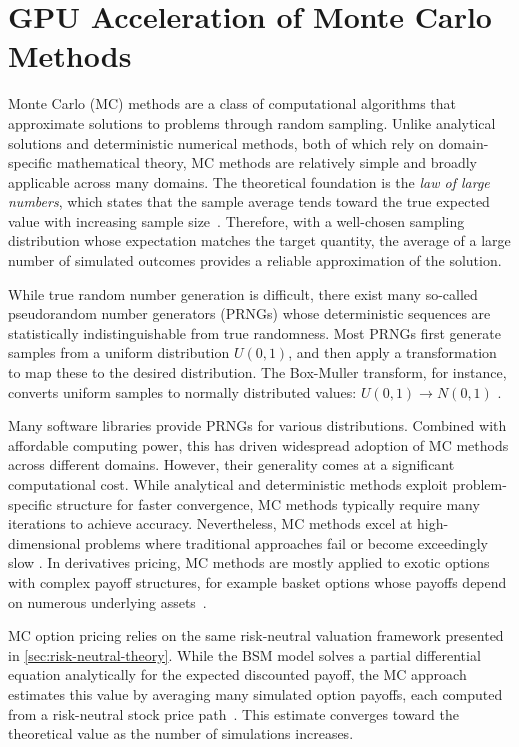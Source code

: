\documentclass[english,12pt,a4paper,pdftex,sci,utf8]{aaltothesis}
\begin{document}
\section{GPU Acceleration of Monte Carlo Methods} \label{sec:gpu-mc}
Monte Carlo (MC) methods are a class of computational algorithms that approximate solutions to problems through random sampling. Unlike analytical solutions and deterministic numerical methods, both of which rely on domain-specific mathematical theory, MC methods are relatively simple and broadly applicable across many domains. The theoretical foundation is the \emph{law of large numbers}, which states that the sample average tends toward the true expected value with increasing sample size~\cite{Ross2020prob}. Therefore, with a well-chosen sampling distribution whose expectation matches the target quantity, the average of a large number of simulated outcomes provides a reliable approximation of the solution.

While true random number generation is difficult, there exist many so-called pseudorandom number generators (PRNGs) whose deterministic sequences are statistically indistinguishable from true randomness. Most PRNGs first generate samples from a uniform distribution $U(0,1)$, and then apply a transformation to map these to the desired distribution. The Box-Muller transform, for instance, converts uniform samples to normally distributed values: $U(0,1) \rightarrow N(0,1)$ \cite{gentle2003random}.

Many software libraries provide PRNGs for various distributions. Combined with affordable computing power, this has driven widespread adoption of MC methods across different domains. However, their generality comes at a significant computational cost. While analytical and deterministic methods exploit problem-specific structure for faster convergence, MC methods typically require many iterations to achieve accuracy. Nevertheless, MC methods excel at high-dimensional problems where traditional approaches fail or become exceedingly slow \cite{gentle2003random}. In derivatives pricing, MC methods are mostly applied to exotic options with complex payoff structures, for example basket options whose payoffs depend on numerous underlying assets~\cite{hull2018,wilmott2013paul}.

MC option pricing relies on the same risk-neutral valuation framework presented in \cref{sec:risk-neutral-theory}. While the BSM model solves a partial differential equation analytically for the expected discounted payoff, the MC approach estimates this value by averaging many simulated option payoffs, each computed from a risk-neutral stock price path~\cite{boyle1977options}. This estimate converges toward the theoretical value as the number of simulations increases.
\end{document}
